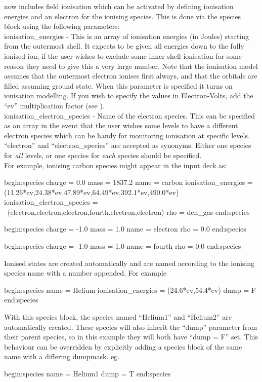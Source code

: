 {\EPOCH} now includes field ionisation which can be activated by defining
ionisation energies and an electron for the ionising species. This is done
via the species block using the following parameters:\\

{\emphtext ionisation\_energies} - This is an array of ionisation energies
  (in Joules) starting from the outermost shell. It expects to be given all
  energies down to the fully ionised ion; if the user wishes to exclude some
  inner shell ionisation for some reason they need to give this a very large
  number. Note that the ionisation model assumes that the outermost electron
  ionises first always, and that the orbitals are filled assuming ground
  state. When this parameter is specified it turns on ionisation modelling.
  If you wish to specify the values in Electron-Volts, add the ``ev''
  multiplication factor (see ).\\

{\emphtext ionisation\_electron\_species} - Name of the electron species. This
  can be specified as an array in the event that the user wishes some levels
  to have a different electron species which can be handy for monitoring
  ionisation at specific levels. ``electron'' and ``electron\_species'' are
  accepted as synonyms. Either one species for \emph{all} levels, or one species
  for \emph{each} species should be specified. \\

For example, ionising carbon species might appear in the input deck as:

\begin{boxverbatim}
begin:species
   charge = 0.0
   mass = 1837.2
   name = carbon
   ionisation_energies = (11.26*ev,24.38*ev,47.89*ev,64.49*ev,392.1*ev,490.0*ev)
   ionisation_electron_species = \
       (electron,electron,electron,fourth,electron,electron)
   rho = den_gas
end:species

begin:species
   charge = -1.0
   mass = 1.0
   name = electron
   rho = 0.0
end:species

begin:species
   charge = -1.0
   mass = 1.0
   name = fourth
   rho = 0.0
end:species
\end{boxverbatim}

Ionised states are created automatically and are named according to the
ionising species name with a number appended. For example
\begin{boxverbatim}
begin:species
   name = Helium
   ionisation_energies = (24.6*ev,54.4*ev)
   dump = F
end:species
\end{boxverbatim}
With this species block, the species named ``Helium1'' and ``Helium2''
are automatically created. These species will also inherit the ``dump''
parameter from their parent species, so in this example they will both have
``dump = F'' set. This behaviour can be overridden by explicitly
adding a species block of the same name with a differing dumpmask.
eg.
\begin{boxverbatim}
begin:species
   name = Helium1
   dump = T
end:species
\end{boxverbatim}


